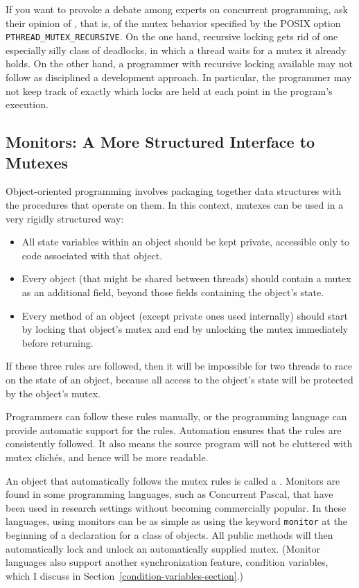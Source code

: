 If you want to provoke a debate among experts on concurrent
programming, ask their opinion of , that is,
of the mutex behavior specified by the POSIX option \texttt{PTHREAD\_MUTEX\_RECURSIVE}.
On the one hand, recursive locking gets rid of one especially silly
class of deadlocks, in which a thread waits for a mutex it already holds.
On the other hand, a programmer with recursive locking available may
not follow as disciplined a development approach. In particular, the programmer
may not keep track of exactly which locks are held at each point
in the program's execution.

\subsection{Monitors: A More Structured Interface to Mutexes}\label{monitors-section}

Object-oriented programming involves packaging together data
structures with the procedures that operate on them.  In this context,
mutexes can be used in a very rigidly structured way:
\begin{itemize}
\item
All state variables within an object should be kept private, accessible only to
code associated with that object.
\item
Every object (that might be shared between threads) should contain a
mutex as an additional field, beyond those fields containing the object's
state.
\item
Every method of an object (except private ones used internally) should
start by locking that object's mutex and end by unlocking the mutex
immediately before returning.
\end{itemize}
If these three rules are followed, then it will be impossible for two
threads to race on the state of an object, because all access to the
object's state will be protected by the object's mutex.

Programmers can follow these rules manually, or the programming
language can provide automatic support for the rules.  Automation
ensures that the rules are consistently followed.  It also means the
source program will not be cluttered with mutex clich{\'e}s, and hence
will be more readable.

An object that automatically follows the mutex rules is called a
.  Monitors are found in some programming languages,
such as Concurrent Pascal, that
have been used in research settings without becoming commercially
popular.  In these languages, using monitors can be as simple as using
the keyword \verb|monitor| at the
beginning of a declaration for a class of objects.  All public methods
will then automatically lock and unlock an automatically supplied
mutex.  (Monitor languages also support another synchronization
feature, condition variables, which I discuss in Section~\ref{condition-variables-section}.)


